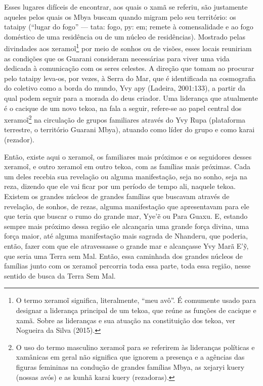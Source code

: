 Esses lugares difíceis de encontrar, aos quais o xamã se referiu, são
justamente aqueles pelos quais os Mbya buscam quando migram pelo seu
território: os tataipy (``lugar do fogo'' --- tata: fogo, py: em; remete à
comensalidade e ao fogo doméstico de uma residência ou de um núcleo de
residências). Mostrado pelas divindades aos
xeramo\~{i}\footnote{O termo
xeramo\~{i} significa, literalmente, ``meu avô''. É
comumente usado para designar a liderança principal de um tekoa, que
reúne as funções de cacique e xamã. Sobre as lideranças e sua atuação
na constituição dos tekoa, ver Nogueira da Silva (2015).} por meio de
sonhos ou de visões, esses locais reuniriam as condições que os Guarani
consideram necessárias para viver uma vida dedicada à comunicação com
os seres celestes. A direção que tomam ao procurar pelo tataipy
leva-os, por vezes, à Serra do Mar, que é identificada na cosmografia
do coletivo como a borda do mundo, Yvy apy (Ladeira, 2001:133), a
partir da qual podem seguir para a morada do deus criador. Uma
liderança que atualmente é o cacique de um novo tekoa, na fala a
seguir, refere-se ao papel central dos
xeramo\~{i}\footnote{O uso do termo masculino
xeramo\~{i} para se referirem às lideranças políticas
e xamânicas em geral não significa que ignorem a presença e a agências
das figuras femininas na condução de grandes famílias Mbya, as xejaryi
kuery (nossas avós) e as kunhã karai kuery (rezadoras).} na circulação
de grupos familiares através do Yvy Rupa (plataforma terrestre, o
território Guarani Mbya), atuando como líder do grupo e como karai
(rezador).

Então, existe aqui o xeramo\~{i}, os familiares mais
próximos e os seguidores desses xeramo\~{i}, e outro
xeramo\~{i} em outro tekoa, com as famílias mais
próximas. Cada um deles recebia sua revelação ou alguma manifestação,
seja no sonho, seja na reza, dizendo que ele vai ficar por um período
de tempo ali, naquele tekoa. Existem os grandes núcleos de grandes
famílias que buscavam através de revelação, de sonhos, de rezas, alguma
manifestação que apresentavam para ele que teria que buscar o rumo do
grande mar, Yye’\~{e} ou Para Guaxu. E, estando sempre mais próximo
dessa região ele alcançaria uma grande força divina, uma força maior,
até alguma manifestação mais sagrada de Nhanderu, que poderia, então,
fazer com que ele atravessasse o grande mar e alcançasse Yvy Marã
E’\~{y}, que seria uma Terra sem Mal. Então, essa caminhada dos grandes
núcleos de famílias junto com os xeramo\~{i}
percorria toda essa parte, toda essa região, nesse sentido de busca da
Terra Sem Mal.

